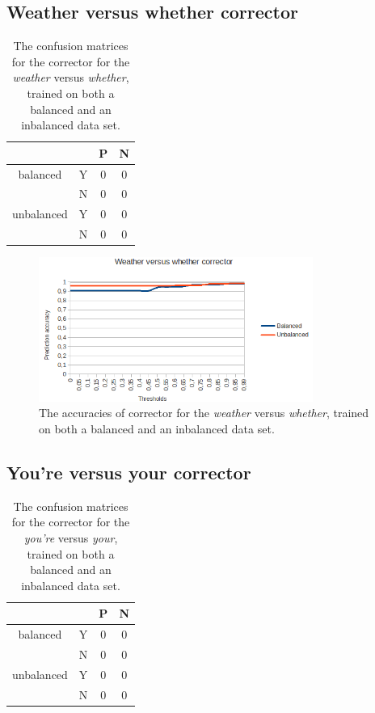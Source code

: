 \documentclass[12pt]{article}
\begin{document}
\subsection{Weather versus whether corrector}

\begin{table}[H] \footnotesize
\centering
\begin{tabular}{|c|c|c|c|}
\hline
&&P&N\\
\hline
balanced&Y&0&0\\
&N&0&0\\
\hline
\hline
unbalanced&Y&0&0\\
&N&0&0\\
\hline
\end{tabular}
\caption{The confusion matrices for the corrector for the \emph{weather} versus \emph{whether}, trained on both a balanced and an inbalanced data set.}
\end{table}

\begin{figure}[H]
\centering
\includegraphics[width=0.8\textwidth]{accuracy_weatherwhether.png}
\caption{The accuracies of corrector for the \emph{weather} versus \emph{whether}, trained on both a balanced and an inbalanced data set.}
\end{figure}

\subsection{You're versus your corrector}

\begin{table}[H] \footnotesize
\centering
\begin{tabular}{|c|c|c|c|}
\hline
&&P&N\\
\hline
balanced&Y&0&0\\
&N&0&0\\
\hline
\hline
unbalanced&Y&0&0\\
&N&0&0\\
\hline
\end{tabular}
\caption{The confusion matrices for the corrector for the \emph{you're} versus \emph{your}, trained on both a balanced and an inbalanced data set.}
\end{table}
\end{document}
